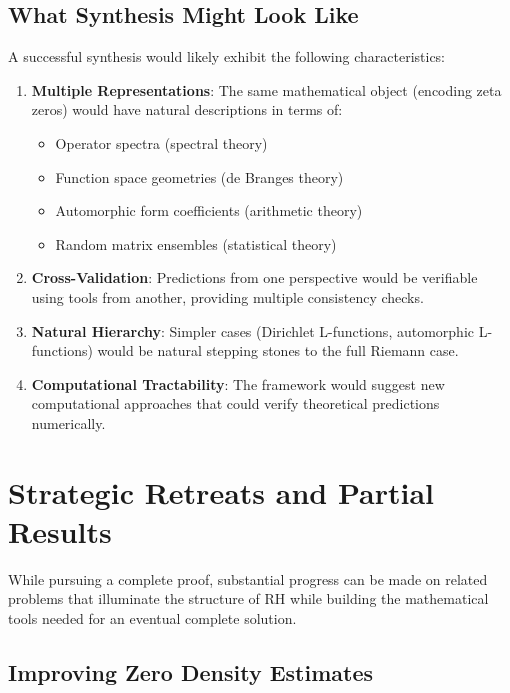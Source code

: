 \subsection{What Synthesis Might Look Like}
\label{subsec:synthesis_structure}

A successful synthesis would likely exhibit the following characteristics:

\begin{framework}
\begin{enumerate}
\item \textbf{Multiple Representations}: The same mathematical object (encoding zeta zeros) would have natural descriptions in terms of:
\begin{itemize}
\item Operator spectra (spectral theory)
\item Function space geometries (de Branges theory)
\item Automorphic form coefficients (arithmetic theory)
\item Random matrix ensembles (statistical theory)
\end{itemize}

\item \textbf{Cross-Validation}: Predictions from one perspective would be verifiable using tools from another, providing multiple consistency checks.

\item \textbf{Natural Hierarchy}: Simpler cases (Dirichlet L-functions, automorphic L-functions) would be natural stepping stones to the full Riemann case.

\item \textbf{Computational Tractability}: The framework would suggest new computational approaches that could verify theoretical predictions numerically.
\end{enumerate}
\end{framework}

\section{Strategic Retreats and Partial Results}
\label{sec:strategic_retreats}

While pursuing a complete proof, substantial progress can be made on related problems that illuminate the structure of RH while building the mathematical tools needed for an eventual complete solution.

\subsection{Improving Zero Density Estimates}
\label{subsec:zero_density}

